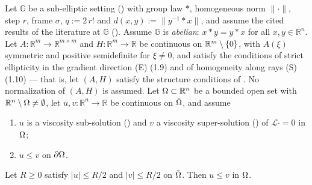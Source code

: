 \begin{theorem}
Let $\mathbb G$ be a sub-elliptic setting () with group law $*$,
homogeneous norm $\|\cdot\|$, step $r$, frame $\sigma$, $q:=2\,r!$ and
$d(x,y):=\|y^{-1}*x\|$, and assume the cited results of the literature
at $\mathbb G$ (). Assume $\mathbb G$ is \emph{abelian}: $x*y=y*x$ for all
$x,y\in\mathbb R^{n}$. Let $A:\mathbb R^{m}\to\mathbb R^{m\times m}$ and
$H:\mathbb R^{m}\to\mathbb R$ be continuous on $\mathbb R^{m}\setminus\{0\}$, with $A(\xi)$
symmetric and positive semidefinite for $\xi\ne0$, and satisfy the conditions of strict
ellipticity in the gradient direction (E) (1.9) and of homogeneity along rays (S) (1.10)
--- that is, let $(A,H)$ satisfy the structure conditions of
. No normalization of $(A,H)$ is assumed. Let
$\Omega\subset\mathbb R^{n}$ be a bounded open set with $\mathbb R^{n}\setminus\Omega\ne\emptyset$, let
$u,v:\mathbb R^{n}\to\mathbb R$ be continuous on $\bar{\Omega}$, and assume
\begin{enumerate}
\item $u$ is a viscosity sub-solution () and $v$ a viscosity
  super-solution () of $\mathcal L\cdot=0$ in $\Omega$;
\item $u\le v$ on $\partial\Omega$.
\end{enumerate}
Let $R\ge0$ satisfy $|u|\le R/2$ and $|v|\le R/2$ on $\bar{\Omega}$. Then $u\le v$ in $\Omega$.
\end{theorem}
